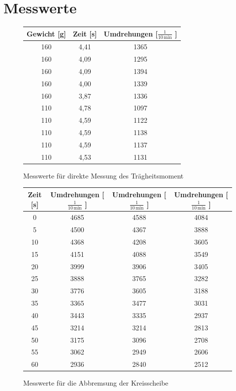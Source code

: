 \documentclass[fontsize=12pt]{scrartcl}
\begin{document}
\section{ Messwerte}
\begin{figure}[H]
\centering
\caption{Messwerte für direkte Messung des Trägheitsmoment}
\begin{tabular}{|c|c|c|} \hline
Gewicht [g] & Zeit [s] & Umdrehungen [$ \frac{1}{10\,\text{min}}$ ]  \\ \hline
160	&4,41	&1365  \\ \hline
160	&4,09	&1295 \\ \hline
160	&4,09	&1394 \\ \hline
160	&4,00	&1339 \\ \hline
160	&3,87	&1336 \\ \hline
110	&4,78	&1097 \\ \hline
110	&4,59	&1122 \\ \hline
110	&4,59	&1138 \\ \hline
110	&4,59	&1137 \\ \hline
110	&4,53	&1131 \\ \hline
\end{tabular}				 
\end{figure}
\begin{figure}[H]
\centering
\caption{Messwerte für die Abbremsung der Kreisscheibe}
\begin{tabular}{|c|c|c|c|} \hline
 Zeit [s] &  Umdrehungen [$ \frac{1}{10\,\text{min}}$ ] & Umdrehungen [$\frac{1}{10\,\text{min}}$ ]  & Umdrehungen [$\frac{1}{10\,\text{min}}$ ] \\ \hline
0		&4685	&4588	&4084 \\ \hline
5		&4500	&4367	&3888 \\ \hline
10	&4368	&4208	&3605 \\ \hline
15	&4151	&4088	&3549 \\ \hline
20	&3999	&3906	&3405 \\ \hline
25	&3888	&3765	&3282 \\ \hline
30	&3776	&3605	&3188 \\ \hline
35	&3365	&3477	&3031 \\ \hline
40	&3443	&3335	&2937 \\ \hline
45	&3214	&3214	&2813 \\ \hline
50	&3175	&3096	&2708 \\ \hline
55	&3062	&2949	&2606 \\ \hline
60	&2936	&2840	&2512 \\ \hline
\end{tabular}				 
\end{figure}
\end{document}
